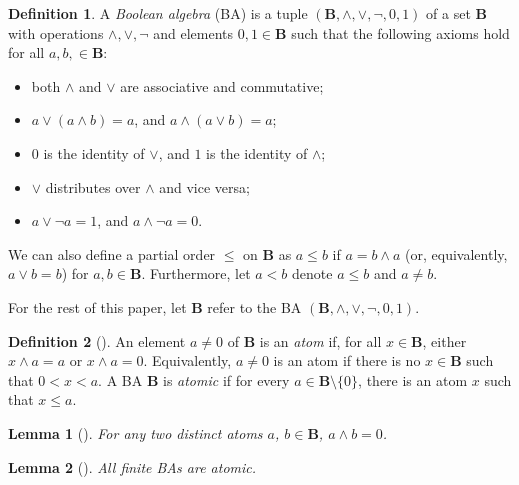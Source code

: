 \documentclass{article}
\newtheorem{lemma}{Lemma}
\theoremstyle{definition}
\newtheorem{definition}{Definition}
\theoremstyle{remark}
\begin{document}
\begin{definition} \label{def:ba}
  A \emph{Boolean algebra} (BA) is a tuple $(\mathbf{B}, \land, \lor, \neg, 0,
  1)$ of a set $\mathbf{B}$ with operations $\land, \lor, \neg$ and elements $0,
  1 \in \mathbf{B}$ such that the following axioms hold for all $a, b, \in
  \mathbf{B}$:
  \begin{itemize}
  \item both $\land$ and $\lor$ are associative and commutative;
  \item $a \lor (a \land b) = a$, and $a \land (a \lor b) = a$;
  \item $0$ is the identity of $\lor$, and $1$ is the identity of $\land$;
  \item $\lor$ distributes over $\land$ and vice versa;
  \item $a \lor \neg a = 1$, and $a \land \neg a = 0$.
  \end{itemize}

  We can also define a partial order $\le$ on $\mathbf{B}$ as $a \le b$ if $a =
  b \land a$ (or, equivalently, $a \lor b = b$) for $a, b \in \mathbf{B}$.
  Furthermore, let $a < b$ denote $a \le b$ and $a \ne b$.
\end{definition}

For the rest of this paper, let $\mathbf{B}$ refer to the BA $(\mathbf{B},
\land, \lor, \neg, 0, 1)$.

\begin{definition}[\cite{DBLP:books/daglib/0090259,levasseur2012applied}]
  An element $a \ne 0$ of $\mathbf{B}$ is an \emph{atom} if, for all $x \in
  \mathbf{B}$, either $x \land a = a$ or $x \land a = 0$. Equivalently, $a \ne
  0$ is an atom if there is no $x \in \mathbf{B}$ such that $0 < x < a$. A BA
  $\mathbf{B}$ is \emph{atomic} if for every $a \in \mathbf{B} \setminus \{0
  \}$, there is an atom $x$ such that $x \le a$.
\end{definition}

\begin{lemma}[\cite{ganesh2006introduction}]
  For any two distinct atoms $a$, $b \in \mathbf{B}$, $a \land b = 0$.
\end{lemma}

\begin{lemma}[\cite{givant2008introduction}] \label{lemma:atomic}
  All finite BAs are atomic.
\end{lemma}

\end{document}
